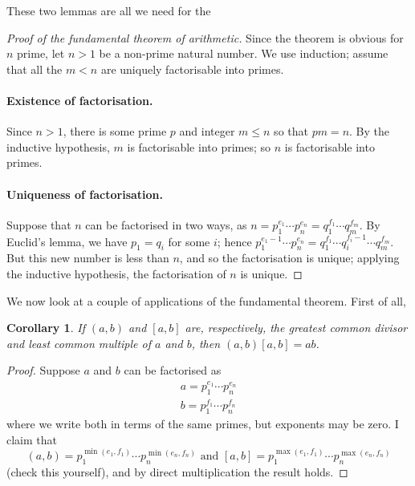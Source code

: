 \documentclass[a4paper,leqno]{article}
\numberwithin{equation}{section}
\newtheorem{cor}[equation]{Corollary}
\theoremstyle{definition}
\theoremstyle{remark}
\begin{document}
These two lemmas are all we need for the
\begin{proof}[Proof of the fundamental theorem of arithmetic]
  Since the theorem is obvious for $ n $ prime, let $ n > 1 $ be a non-prime natural number. We use induction; assume that all the $ m < n $ are uniquely
  factorisable into primes.
  \paragraph{Existence of factorisation.}
  Since $ n > 1 $, there is some prime $ p $ and integer $ m \leq n $ so that $ pm = n $. By the inductive hypothesis, $ m $ is factorisable into
  primes; so $ n $ is factorisable into primes.
  \paragraph{Uniqueness of factorisation.}
  Suppose that $ n $ can be factorised in two ways, as $ n = p_1^{e_1} \cdots p_n^{e_n} = q_1^{f_1} \cdots q_m^{f_m} $. By Euclid's lemma,
  we have $ p_1 = q_i $ for some $ i $; hence $ p_1^{e_1 - 1} \cdots p_n^{e_n} = q_1^{f_1} \cdots q_i^{f_i - 1} \cdots q_m^{f_m} $. But this
  new number is less than $ n $, and so the factorisation is unique; applying the inductive hypothesis, the factorisation of $ n $ is unique.
\end{proof}

We now look at a couple of applications of the fundamental theorem. First of all,
\begin{cor}
  If $ (a,b) $ and $ [a,b] $ are, respectively, the greatest common divisor and least common multiple of $ a $ and $ b $,
  then $ (a,b)[a,b] = ab $.
\end{cor}
\begin{proof}
  Suppose $ a $ and $ b $ can be factorised as
  \begin{gather*}
    a = p_1^{e_1} \cdots p_n^{e_n}\\
    b = p_1^{f_1} \cdots p_n^{f_n}
  \end{gather*}
  where we write both in terms of the same primes, but exponents may be zero. I claim that
  \begin{displaymath}
    (a,b) = p_1^{\min(e_1, f_1)} \cdots p_n^{\min(e_n, f_n)} \text{ and } [a,b] = p_1^{\max(e_1, f_1)} \cdots p_n^{\max(e_n, f_n)}
  \end{displaymath}
  (check this yourself), and by direct multiplication the result holds.
\end{proof}
\end{document}
